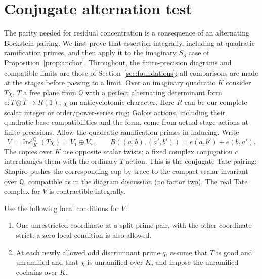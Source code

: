 \section{Conjugate alternation test}\label{sec:alternation-imaginary}

The parity needed for residual concentration is a consequence of an alternating Bockstein pairing. We first prove that assertion integrally, including at quadratic ramification primes, and then apply it to the imaginary \(S_3\) case of Proposition~\ref{prop:anchor}. Throughout, the finite-precision diagrams and compatible limits are those of Section~\ref{sec:foundations}; all comparisons are made at the stages before passing to a limit. Over an imaginary quadratic \(K\) consider \(T\chi\), \(T\) a free plane from \(\mathbb Q\) with a perfect alternating determinant form \(e:T\otimes T\to R(1)\), \(\chi\) an anticyclotomic character. Here \(R\) can be our complete scalar integer or order/power-series ring; Galois actions, including their quadratic-base compatibilities and the form, come from actual stage actions at finite precisions. Allow the quadratic ramification primes in inducing. Write
\[
 V=\operatorname{Ind}_K^{\mathbb Q}(T\chi)=V_1\oplus V_2,\qquad
 B((a,b),(a',b'))=e(a,b')+e(b,a').
\]
The copies over \(K\) use opposite scalar twists; a fixed complex conjugation \(c\) interchanges them with the ordinary \(T\)-action. This is the conjugate Tate pairing; Shapiro pushes the corresponding cup by trace to the compact scalar invariant over \(\mathbb Q\), compatible as in the diagram discussion (no factor two). The real Tate complex for \(V\) is contractible integrally.

Use the following local conditions for \(V\):
\begin{enumerate}[label=\textup{(\roman*)}]
\item One unrestricted coordinate at a split prime pair, with the other coordinate strict; a zero local condition is also allowed.
\item At each newly allowed odd discriminant prime \(q\), assume that \(T\) is good and unramified and that \(\chi\) is unramified over \(K\), and impose the unramified cochains over \(K\).
\end{enumerate}

